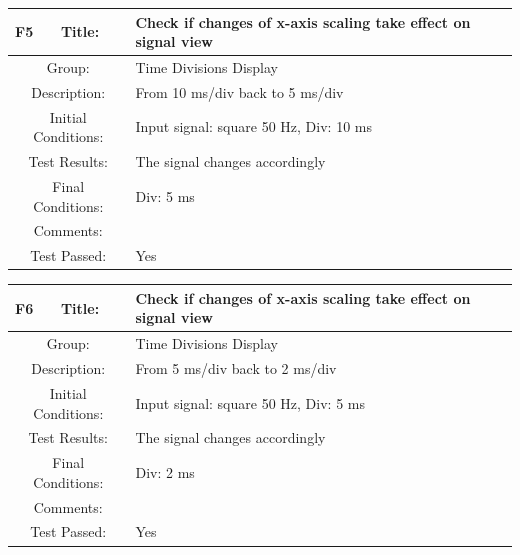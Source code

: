 \documentclass[12pt]{article}
\begin{document}
		\begin{table}[H]
	\begin{center}
		\begin{tabular}{| m{2cm}|m{2cm}|m{12cm}|}
			\hline 
			\bf F5&\bf Title:&\bf Check if changes of x-axis scaling take effect on signal view\\ 
			\hline 
			\multicolumn{2}{|c|}{Group:}&Time Divisions Display\\ 
			\hline 
			\multicolumn{2}{|c|}{Description:}&From 10 ms/div back to 5 ms/div\\ 
			\hline 
			\multicolumn{2}{|c|}{Initial Conditions:}&Input signal: square 50 Hz, Div: 10 ms\\ 
			\hline 
			\multicolumn{2}{|c|}{Test Results:}&The signal changes accordingly\\ 
			\hline 
			\multicolumn{2}{|c|}{Final Conditions:}&Div: 5 ms\\ 
			\hline 
			\multicolumn{2}{|c|}{Comments:}&\\ 
			\hline 
			\multicolumn{2}{|c|}{Test Passed:}&Yes \\ 
			\hline 
		\end{tabular} 
	\end{center}
\end{table}	
		\begin{table}[H]
	\begin{center}
		\begin{tabular}{| m{2cm}|m{2cm}|m{12cm}|}
			\hline 
			\bf F6&\bf Title:&\bf Check if changes of x-axis scaling take effect on signal view\\ 
			\hline 
			\multicolumn{2}{|c|}{Group:}&Time Divisions Display\\ 
			\hline 
			\multicolumn{2}{|c|}{Description:}&From 5 ms/div back to 2 ms/div\\ 
			\hline 
			\multicolumn{2}{|c|}{Initial Conditions:}&Input signal: square 50 Hz, Div: 5 ms\\ 
			\hline 
			\multicolumn{2}{|c|}{Test Results:}&The signal changes accordingly\\ 
			\hline 
			\multicolumn{2}{|c|}{Final Conditions:}&Div: 2 ms\\ 
			\hline 
			\multicolumn{2}{|c|}{Comments:}&\\ 
			\hline 
			\multicolumn{2}{|c|}{Test Passed:}&Yes \\ 
			\hline 
		\end{tabular} 
	\end{center}
\end{table}	
\end{document}
